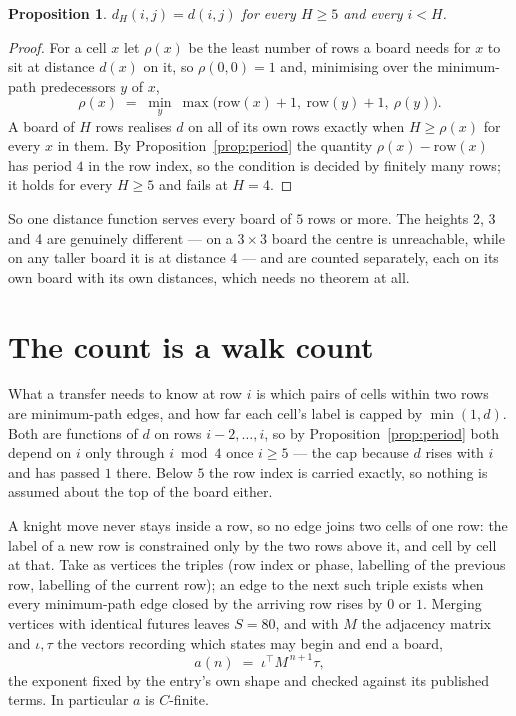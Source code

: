 \documentclass[11pt,a4paper]{article}
\theoremstyle{plain}
\newtheorem{proposition}[theorem]{Proposition}
\theoremstyle{definition}
\begin{document}
\begin{proposition}\label{prop:height}
$d_H(i,j)=d(i,j)$ for every $H\ge5$ and every $i<H$.
\end{proposition}

\begin{proof}
For a cell $x$ let $\rho(x)$ be the least number of rows a board needs for $x$ to sit at distance $d(x)$ on it, so $\rho(0,0)=1$ and, minimising over the minimum-path predecessors $y$ of $x$,
\[ \rho(x)\;=\;\min_y\ \max\bigl(\mathrm{row}(x)+1,\ \mathrm{row}(y)+1,\ \rho(y)\bigr). \]
A board of $H$ rows realises $d$ on all of its own rows exactly when $H\ge\rho(x)$ for every $x$ in them. By Proposition~\ref{prop:period} the quantity $\rho(x)-\mathrm{row}(x)$ has period $4$ in the row index, so the condition is decided by finitely many rows; it holds for every $H\ge5$ and fails at $H=4$.
\end{proof}

So one distance function serves every board of $5$ rows or more. The heights 2, 3 and 4 are genuinely different --- on a $3\times3$ board the centre is unreachable, while on any taller board it is at distance $4$ --- and are counted separately, each on its own board with its own distances, which needs no theorem at all.

\section{The count is a walk count}

What a transfer needs to know at row $i$ is which pairs of cells within two rows are minimum-path edges, and how far each cell's label is capped by $\min(1,d)$. Both are functions of $d$ on rows $i-2,\dots,i$, so by Proposition~\ref{prop:period} both depend on $i$ only through $i\bmod 4$ once $i\ge5$ --- the cap because $d$ rises with $i$ and has passed $1$ there. Below $5$ the row index is carried exactly, so nothing is assumed about the top of the board either.

A knight move never stays inside a row, so no edge joins two cells of one row: the label of a new row is constrained only by the two rows above it, and cell by cell at that. Take as vertices the triples (row index or phase, labelling of the previous row, labelling of the current row); an edge to the next such triple exists when every minimum-path edge closed by the arriving row rises by $0$ or $1$. Merging vertices with identical futures leaves $S=80$, and with $M$ the adjacency matrix and $\iota,\tau$ the vectors recording which states may begin and end a board,
\[
a(n)\;=\;\iota^{\!\top}M^{\,n+1}\tau ,
\]
the exponent fixed by the entry's own shape and checked against its published terms. In
particular $a$ is $C$-finite.
\end{document}
